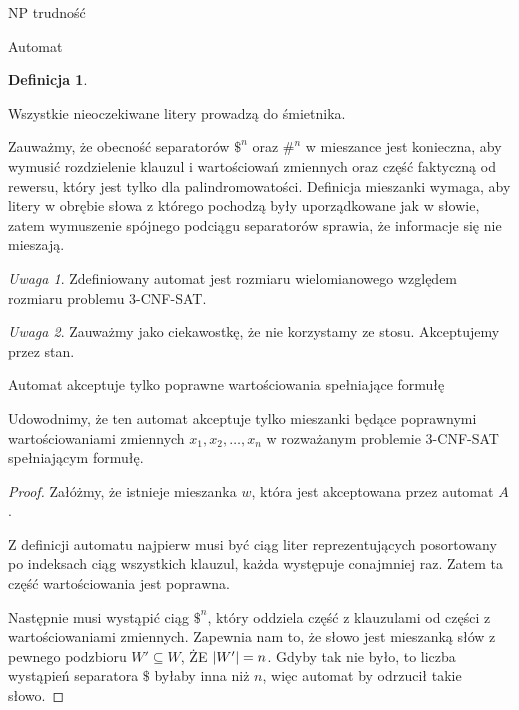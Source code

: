\documentclass{article}
\theoremstyle{definition}
\newtheorem{definition}{Definicja}[section]
\theoremstyle{remark}
\newtheorem{remark}{Uwaga}[section]
\begin{document}
\begin{section}{NP trudność}
\begin{subsection}{Automat}
\begin{definition}
\begin{itemize}
         \end{itemize}

         Wszystkie nieoczekiwane litery prowadzą do śmietnika.

         Zauważmy, że obecność separatorów $ \$^n $ oraz $ \#^n $ w mieszance jest
         konieczna, aby wymusić rozdzielenie klauzul i wartościowań zmiennych oraz część
         faktyczną od rewersu, który jest tylko dla palindromowatości. Definicja
         mieszanki wymaga, aby litery w obrębie słowa z którego pochodzą były
         uporządkowane jak w słowie, zatem wymuszenie spójnego podciągu separatorów
         sprawia, że informacje się nie mieszają.

     \end{definition}

     \begin{remark}
         Zdefiniowany automat jest rozmiaru wielomianowego względem rozmiaru problemu
         3-CNF-SAT.
     \end{remark}

     \begin{remark}
         Zauważmy jako ciekawostkę, że nie korzystamy ze stosu. Akceptujemy przez stan.
     \end{remark}

     \begin{subsection}{Automat akceptuje tylko poprawne wartościowania spełniające formułę}

         Udowodnimy, że ten automat akceptuje tylko mieszanki będące poprawnymi
         wartościowaniami zmiennych $x_1, x_2, \ldots, x_n$ w rozważanym problemie
         3-CNF-SAT spełniającym formułę.

         \begin{proof}
             Załóżmy, że istnieje mieszanka $w$, która jest akceptowana przez automat
             $A$.

             Z definicji automatu najpierw musi być ciąg liter reprezentujących posortowany
             po indeksach ciąg wszystkich klauzul, każda występuje conajmniej raz. Zatem ta
             część wartościowania jest poprawna.

             Następnie musi wystąpić ciąg $ \$^n $, który oddziela część z klauzulami od
             części z wartościowaniami zmiennych. Zapewnia nam to, że słowo jest mieszanką
             słów z pewnego podzbioru $W' \subseteq W$, ŻE $ \abs{W'} = n $. Gdyby tak nie
             było, to liczba wystąpień separatora $ \$ $ byłaby inna niż $n$, więc automat
             by odrzucił takie słowo.


\end{proof}
\end{subsection}
\end{subsection}
\end{section}
\end{document}
